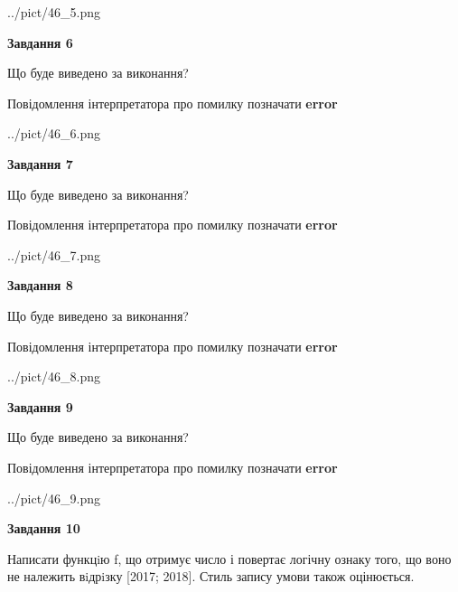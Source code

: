 \documentclass[12pt, ukrainian]{article}
\begin{document}
{\begin {large}
\begin{center}
	{../pict/46_5.png}
\end{center}
\newpage

{\begin {center}\textbf{Завдання 6}\end {center}}\par
Що буде виведено за виконання? \par
Повідомлення інтерпретатора про помилку позначати \textbf{error}

\begin{center}
	{../pict/46_6.png}
\end{center}
\newpage

{\begin {center}\textbf{Завдання 7}\end {center}}\par
Що буде виведено за виконання? \par
Повідомлення інтерпретатора про помилку позначати \textbf{error}

\begin{center}
	{../pict/46_7.png}
\end{center}
\newpage

{\begin {center}\textbf{Завдання 8}\end {center}}\par
Що буде виведено за виконання? \par
Повідомлення інтерпретатора про помилку позначати \textbf{error}

\begin{center}
	{../pict/46_8.png}
\end{center}
\newpage

{\begin {center}\textbf{Завдання 9}\end {center}}\par
Що буде виведено за виконання? \par
Повідомлення інтерпретатора про помилку позначати \textbf{error}

\begin{center}
	{../pict/46_9.png}
\end{center}
\newpage

{\begin {center}\textbf{Завдання 10}\end {center}}\par

Написати функцiю f, що отримує число і повертає логічну ознаку того, що воно не належить вiдрiзку [2017; 2018]. Стиль запису умови також оцінюється.\par
\newpage

\end {large}}
\end{document}
